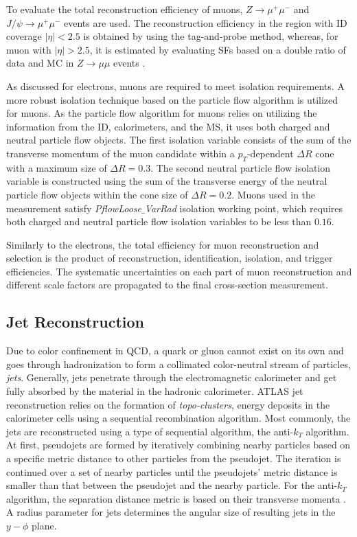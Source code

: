 To evaluate the total reconstruction efficiency of muons, $Z \rightarrow \mu^{+}\mu^{-}$ and $J/\psi \rightarrow \mu^{+}\mu^{-}$ events are used. The reconstruction efficiency in the region with ID coverage $|\eta|<2.5$ is obtained by using the tag-and-probe method, whereas, for muon with $|\eta|>2.5$, it is estimated by evaluating SFs based on a double ratio of data and MC in $Z \rightarrow \mu\mu$ events \cite{MuonEffLargeEta}.

As discussed for electrons, muons are required to meet isolation requirements. A more robust isolation technique based on the particle flow algorithm is utilized for muons. As the particle flow algorithm for muons relies on utilizing the information from the ID, calorimeters, and the MS, it uses both charged and neutral particle flow objects. The first isolation variable consists of the sum of the transverse momentum of the muon candidate within a $p_{T}$-dependent $\Delta R$ cone with a maximum size of $\Delta R = 0.3$. The second neutral particle flow isolation variable is constructed using the sum of the transverse energy of the neutral particle flow objects within the cone size of $\Delta R = 0.2$. Muons used in the measurement satisfy \textit{PflowLoose$\_$VarRad} isolation working point, which requires both charged and neutral particle flow isolation variables to be less than $0.16$. 

Similarly to the electrons, the total efficiency for muon reconstruction and selection is the product of reconstruction, identification, isolation, and trigger efficiencies. The systematic uncertainties on each part of muon reconstruction and different scale factors are propagated to the final cross-section measurement.

\subsection{Jet Reconstruction}
\label{subsec:ParticleRecon_Jets}

Due to color confinement in QCD, a quark or gluon cannot exist on its own and goes through hadronization to form a collimated color-neutral stream of particles, \textit{jets}. Generally, jets penetrate through the electromagnetic calorimeter and get fully absorbed by the material in the hadronic calorimeter. ATLAS jet reconstruction relies on the formation of \textit{topo-clusters}, energy deposits in the calorimeter cells using a sequential recombination algorithm. Most commonly, the jets are reconstructed using a type of sequential algorithm, the anti-$k_{T}$ algorithm. At first, pseudojets are formed by iteratively combining nearby particles based on a specific metric distance to other particles from the pseudojet. The iteration is continued over a set of nearby particles until the pseudojets' metric distance is smaller than that between the pseudojet and the nearby particle. For the anti-$k_{T}$ algorithm, the separation distance metric is based on their transverse momenta \cite{AntiKtAlgo}. A radius parameter for jets determines the angular size of resulting jets in the $y-\phi$ plane. 

